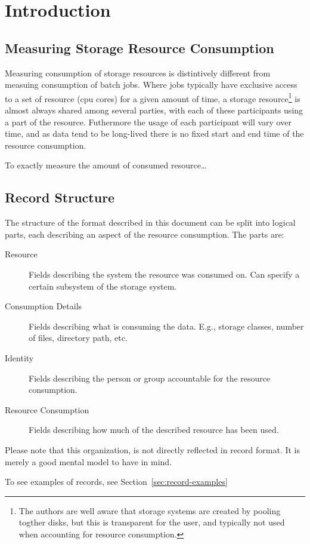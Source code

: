 \section{Introduction}


\subsection{Measuring Storage Resource Consumption}

Measuring consumption of storage resources is distintively different from
measuing consumption of batch jobs. Where jobs typically have exclusive access
to a set of resource (cpu cores) for a given amount of time, a storage
resource\footnote{The authors are well aware that storage systems are created
by pooling togther disks, but this is transparent for the user, and typically
not used when accounting for resource consumption.} is almost always shared
among several parties, with each of these participants using a part of the
resource. Futhermore the usage of each participant will vary over time, and as
data tend to be long-lived there is no fixed start and end time of the resource
consumption.

To exactly measure the amount of consumed resource\ldots



\subsection{Record Structure}

The structure of the format described in this document can be split into
logical parts, each describing an aspect of the resource consumption. The parts
are:

\begin{description}

\item[Resource] Fields describing the system the resource was consumed on. Can
specify a certain subsystem of the storage system.

\item[Consumption Details] Fields describing what is consuming the data. E.g.,
storage classes, number of files, directory path, etc.

\item[Identity] Fields describing the person or group accountable for the
resource consumption.

\item[Resource Consumption] Fields describing how much of the described
resource has been used.

\end{description}

Please note that this organization, is not directly reflected in record format.
It is merely a good mental model to have in mind.

To see examples of records, see Section~\ref{sec:record-examples}

